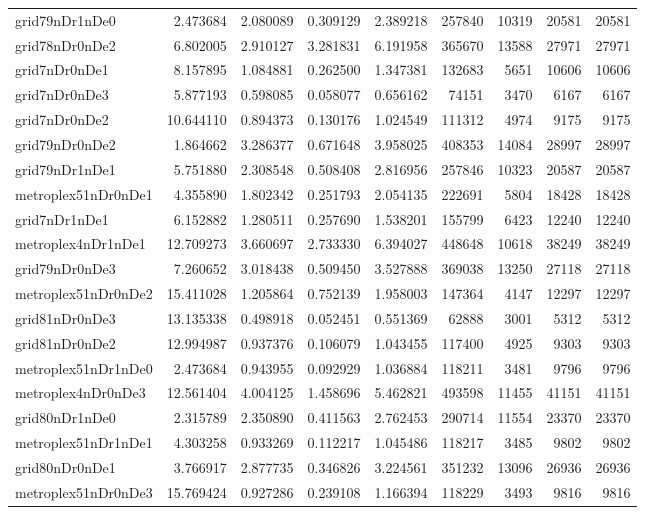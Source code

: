 \documentclass[../../../thesis.tex]{subfiles}
\begin{document}
\begin{longtable}{|l|r|r|r|r|r|r|r|r|}
grid79nDr1nDe0 & 2.473684 & 2.080089 & 0.309129 & 2.389218 & 257840 & 10319 & 20581 & 20581 \\
grid78nDr0nDe2 & 6.802005 & 2.910127 & 3.281831 & 6.191958 & 365670 & 13588 & 27971 & 27971 \\
grid7nDr0nDe1 & 8.157895 & 1.084881 & 0.262500 & 1.347381 & 132683 & 5651 & 10606 & 10606 \\
grid7nDr0nDe3 & 5.877193 & 0.598085 & 0.058077 & 0.656162 & 74151 & 3470 & 6167 & 6167 \\
grid7nDr0nDe2 & 10.644110 & 0.894373 & 0.130176 & 1.024549 & 111312 & 4974 & 9175 & 9175 \\
grid79nDr0nDe2 & 1.864662 & 3.286377 & 0.671648 & 3.958025 & 408353 & 14084 & 28997 & 28997 \\
grid79nDr1nDe1 & 5.751880 & 2.308548 & 0.508408 & 2.816956 & 257846 & 10323 & 20587 & 20587 \\
metroplex51nDr0nDe1 & 4.355890 & 1.802342 & 0.251793 & 2.054135 & 222691 & 5804 & 18428 & 18428 \\
grid7nDr1nDe1 & 6.152882 & 1.280511 & 0.257690 & 1.538201 & 155799 & 6423 & 12240 & 12240 \\
metroplex4nDr1nDe1 & 12.709273 & 3.660697 & 2.733330 & 6.394027 & 448648 & 10618 & 38249 & 38249 \\
grid79nDr0nDe3 & 7.260652 & 3.018438 & 0.509450 & 3.527888 & 369038 & 13250 & 27118 & 27118 \\
metroplex51nDr0nDe2 & 15.411028 & 1.205864 & 0.752139 & 1.958003 & 147364 & 4147 & 12297 & 12297 \\
grid81nDr0nDe3 & 13.135338 & 0.498918 & 0.052451 & 0.551369 & 62888 & 3001 & 5312 & 5312 \\
grid81nDr0nDe2 & 12.994987 & 0.937376 & 0.106079 & 1.043455 & 117400 & 4925 & 9303 & 9303 \\
metroplex51nDr1nDe0 & 2.473684 & 0.943955 & 0.092929 & 1.036884 & 118211 & 3481 & 9796 & 9796 \\
metroplex4nDr0nDe3 & 12.561404 & 4.004125 & 1.458696 & 5.462821 & 493598 & 11455 & 41151 & 41151 \\
grid80nDr1nDe0 & 2.315789 & 2.350890 & 0.411563 & 2.762453 & 290714 & 11554 & 23370 & 23370 \\
metroplex51nDr1nDe1 & 4.303258 & 0.933269 & 0.112217 & 1.045486 & 118217 & 3485 & 9802 & 9802 \\
grid80nDr0nDe1 & 3.766917 & 2.877735 & 0.346826 & 3.224561 & 351232 & 13096 & 26936 & 26936 \\
metroplex51nDr0nDe3 & 15.769424 & 0.927286 & 0.239108 & 1.166394 & 118229 & 3493 & 9816 & 9816 \\

\end{longtable}
\end{document}

